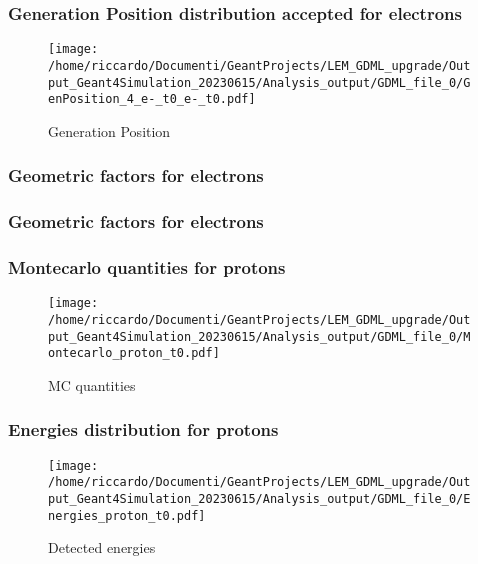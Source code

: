 \documentclass[8pt]{beamer}
\begin{document}
        \begin{frame}
            \frametitle{Generation Position distribution accepted for electrons}
        
        \begin{figure}[h]
            \centering
            \texttt{[image: /home/riccardo/Documenti/GeantProjects/LEM\_GDML\_upgrade/Output\_Geant4Simulation\_20230615/Analysis\_output/GDML\_file\_0/GenPosition\_4\_e-\_t0\_e-\_t0.pdf]}
            \caption{Generation Position}
        \end{figure}
        
        \end{frame}
        
        \begin{frame}
            \frametitle{Geometric factors for electrons}
        
        \end{frame}
        
        \begin{frame}
            \frametitle{Geometric factors for electrons}
        
        \end{frame}
        
        \begin{frame}
            \frametitle{Montecarlo quantities for protons}
        
        \begin{figure}[h]
            \centering
            \texttt{[image: /home/riccardo/Documenti/GeantProjects/LEM\_GDML\_upgrade/Output\_Geant4Simulation\_20230615/Analysis\_output/GDML\_file\_0/Montecarlo\_proton\_t0.pdf]}
            \caption{MC quantities}
        \end{figure}
        
        \end{frame}
        
        \begin{frame}
            \frametitle{Energies distribution for protons}
        
        \begin{figure}[h]
            \centering
            \texttt{[image: /home/riccardo/Documenti/GeantProjects/LEM\_GDML\_upgrade/Output\_Geant4Simulation\_20230615/Analysis\_output/GDML\_file\_0/Energies\_proton\_t0.pdf]}
            \caption{Detected energies}
        \end{figure}
        
        \end{frame}
        
\end{document}

